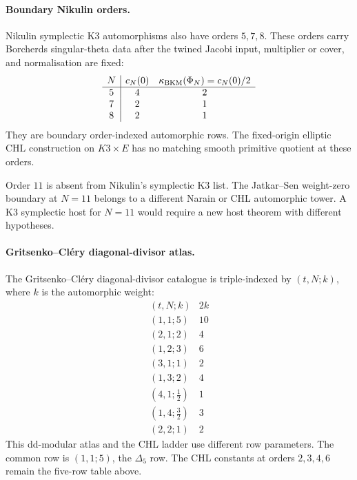 \paragraph{Boundary Nikulin orders.}
Nikulin symplectic K3 automorphisms also have orders \(5,7,8\). These
orders carry Borcherds singular-theta data after the twined Jacobi
input, multiplier or cover, and normalisation are fixed:
\[
  \begin{array}{c|cc}
    N & c_N(0) & \kappa_{\mathrm{BKM}}(\Phi_N)=c_N(0)/2 \\ \hline
    5 & 4 & 2 \\
    7 & 2 & 1 \\
    8 & 2 & 1
  \end{array}
\]
They are boundary order-indexed automorphic rows. The fixed-origin
elliptic CHL construction on \(K3\times E\) has no matching smooth
primitive quotient at these orders.

Order \(11\) is absent from Nikulin's symplectic K3 list. The
Jatkar--Sen weight-zero boundary at \(N=11\) belongs to a different
Narain or CHL automorphic tower. A K3 symplectic host for \(N=11\)
would require a new host theorem with different hypotheses.

\paragraph{Gritsenko--Cl\'ery diagonal-divisor atlas.}
The Gritsenko--Cl\'ery diagonal-divisor catalogue is triple-indexed by
\((t,N;k)\), where \(k\) is the automorphic weight:
\[
  \begin{array}{c|c}
    (t,N;k) & 2k \\ \hline
    (1,1;5) & 10 \\
    (2,1;2) & 4 \\
    (1,2;3) & 6 \\
    (3,1;1) & 2 \\
    (1,3;2) & 4 \\
    (4,1;\tfrac12) & 1 \\
    (1,4;\tfrac32) & 3 \\
    (2,2;1) & 2
  \end{array}
\]
This dd-modular atlas and the CHL ladder use different row parameters.
The common row is \((1,1;5)\), the \(\Delta_5\) row. The CHL constants
at orders \(2,3,4,6\) remain the five-row table above.

